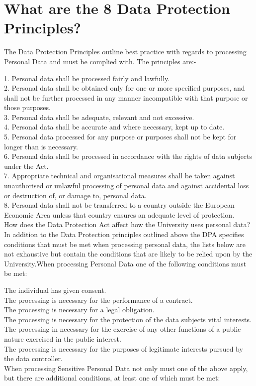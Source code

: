 \documentclass[12pt]{article}
\begin{document}
\section{What are the 8 Data Protection Principles?}
The Data Protection Principles outline best practice with regards to processing Personal Data and must be complied with. The principles are:-

1. Personal data shall be processed fairly and lawfully.\\

2. Personal data shall be obtained only for one or more specified purposes, and shall not be further processed in any manner incompatible with that purpose or those purposes.\\

3. Personal data shall be adequate, relevant and not excessive.\\

4. Personal data shall be accurate and where necessary, kept up to date.\\

5. Personal data processed for any purpose or purposes shall not be kept for longer than is necessary.\\

6. Personal data shall be processed in accordance with the rights of data subjects under the Act.\\

7. Appropriate technical and organisational measures shall be taken against unauthorised or unlawful processing of personal data and against accidental loss or destruction of, or damage to, personal data.\\

8. Personal data shall not be transferred to a country outside the European Economic Area unless that country ensures an adequate level of protection.\\

How does the Data Protection Act affect how the University uses personal data?
In addition to the Data Protection principles outlined above the DPA specifies conditions that must be met when processing personal data, the lists below are not exhaustive but contain the conditions that are likely to be relied upon by the University.When processing Personal Data one of the following conditions must be met:

The individual has given consent.\\
The processing is necessary for the performance of a contract.\\
The processing is necessary for a legal obligation.\\
The processing is necessary for the protection of the data subjects vital interests.\\
The processing in necessary for the exercise of any other functions of a public nature exercised in the public interest.\\
The processing is necessary for the purposes of legitimate interests pursued by the data controller.\\
When processing Sensitive Personal Data not only must one of the above apply, but there are additional conditions, at least one of which must be met:\\
\end{document}
